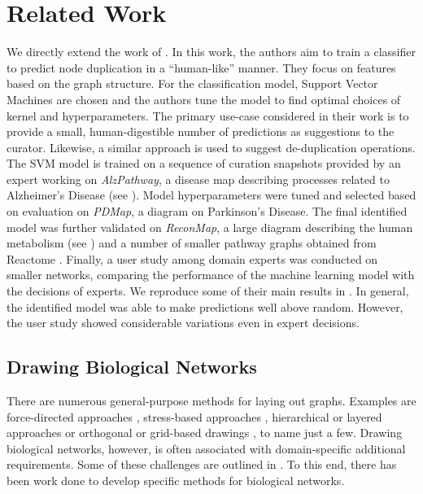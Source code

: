 \documentclass[
	fontsize=10pt, %
	twoside=true, %
	secnumdepth=1, %
  toc=indentunnumbered %
]{kaobook}
\begin{document}
\chapter{Related Work}
\label{sec:related-work}
We directly extend the work of \citeauthor{nielsen_MachineLearningSupport_2019}
\cite{nielsen_MachineLearningSupport_2019}. In this work, the authors aim to
train a classifier to predict node duplication in a ``human-like'' manner. They
focus on features based on the graph structure. For the classification model,
Support Vector Machines are chosen and the authors tune the model to find
optimal choices of kernel and hyperparameters. The primary use-case considered
in their work is to provide a small, human-digestible number of predictions as
suggestions to the curator. Likewise, a similar approach is used to suggest
de-duplication operations. The SVM model is trained on a sequence of curation
snapshots provided by an expert working on \textit{AlzPathway}, a disease map
describing processes related to Alzheimer's Disease (see ).
Model hyperparameters were tuned and selected based on evaluation on
\textit{PDMap}, a diagram on Parkinson's Disease. The final identified model was
further validated on \textit{ReconMap}, a large diagram describing the human
metabolism (see ) and a number of smaller pathway graphs obtained from Reactome
\cite{joshi-tope_ReactomeKnowledgebaseBiological_2005}. Finally, a user study
among domain experts was conducted on smaller networks, comparing the
performance of the machine learning model
with the decisions of experts. We reproduce some of their main results in
. In general, the
identified model was able to make predictions well above random. However, the
user study showed considerable variations even in expert decisions.



\section{Drawing Biological Networks}

There are numerous general-purpose methods for laying out graphs. Examples are
force-directed approaches \cite{kobourov_ForceDirectedDrawingAlgorithms_2013},
stress-based approaches \cite{gansner_GraphDrawingStress_2005}, hierarchical or
layered approaches \cite{healy_HierarchicalDrawingAlgorithms_2013} or orthogonal
or grid-based drawings \cite{duncan_PlanarOrthogonalPolyline_2013}, to name just
a few. Drawing biological networks, however, is often associated with
domain-specific additional requirements. Some of these challenges are outlined
in . To this end, there has been work done to develop
specific methods for biological networks.
\end{document}
